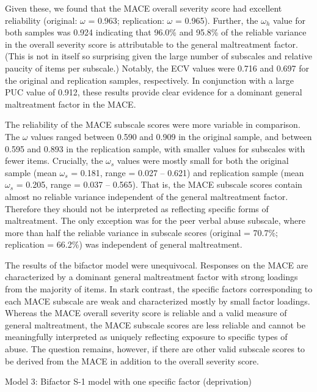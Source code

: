 \documentclass[letterpaper,man,natbib,floatsintext,longtable]{apa6}
\makeatletter
\renewcommand{\subsubsection}{\@startsection{subsubsection}{3}
  {\z@}%
  {\b@level@two@skip}{\e@level@two@skip}%
  {\normalfont\normalsize\bfseries}}
\makeatother
\begin{document}
Given these, we found that the MACE overall severity score had excellent reliability (original: $\omega$ = 0.963; replication: $\omega$ = 0.965). Further, the $\omega_h$ value for both samples was 0.924 indicating that 96.0\% and 95.8\% of the reliable variance in the overall severity score is attributable to the general maltreatment factor. (This is not in itself so surprising given the large number of subscales and relative paucity of items per subscale.) Notably, the ECV values were 0.716 and 0.697 for the original and replication samples, respectively. In conjunction with a large PUC value of 0.912, these results provide clear evidence for a dominant general maltreatment factor in the MACE. 

The reliability of the MACE subscale scores were more variable in comparison. The $\omega$ values ranged between 0.590 and 0.909 in the original sample, and between 0.595 and 0.893 in the replication sample, with smaller values for subscales with fewer items. Crucially, the $\omega_s$ values were mostly small for both the original sample (mean $\omega_s$ = 0.181, range = 0.027 -- 0.621) and replication sample (mean $\omega_s$ = 0.205, range = 0.037 -- 0.565). That is, the MACE subscale scores contain almost no reliable variance independent of the general maltreatment factor. Therefore they should not be interpreted as reflecting specific forms of maltreatment. The only exception was for the peer verbal abuse subscale, where more than half the reliable variance in subscale scores (original = 70.7\%; replication = 66.2\%) was independent of general maltreatment.

The results of the bifactor model were unequivocal. Responses on the MACE are characterized by a dominant general maltreatment factor with strong loadings from the majority of items. In stark contrast, the specific factors corresponding to each MACE subscale are weak and characterized mostly by small factor loadings. Whereas the MACE overall severity score is reliable and a valid measure of general maltreatment, the MACE subscale scores are less reliable and cannot be meaningfully interpreted as uniquely reflecting exposure to specific types of abuse. The question remains, however, if there are other valid subscale scores to be derived from the MACE in addition to the overall severity score.

\subsubsection{Model 3: Bifactor S-1 model with one specific factor (deprivation)}
\end{document}

